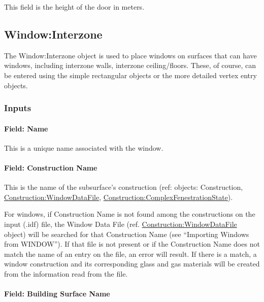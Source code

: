 This field is the height of the door in meters.

\subsection{Window:Interzone}\label{windowinterzone}

The Window:Interzone object is used to place windows on surfaces that can have windows, including interzone walls, interzone ceiling/floors. These, of course, can be entered using the simple rectangular objects or the more detailed vertex entry objects.

\subsubsection{Inputs}\label{inputs-17-010}

\paragraph{Field: Name}\label{field-name-13-011}

This is a unique name associated with the window.

\paragraph{Field: Construction Name}\label{field-construction-name-13}

This is the name of the subsurface's construction (ref: objects: Construction, \hyperref[constructionwindowdatafile]{Construction:WindowDataFile}, \hyperref[constructioncomplexfenestrationstate]{Construction:ComplexFenestrationState}).

For windows, if Construction Name is not found among the constructions on the input (.idf) file, the Window Data File (ref. \hyperref[constructionwindowdatafile]{Construction:WindowDataFile} object) will be searched for that Construction Name (see ``Importing Windows from WINDOW''). If that file is not present or if the Construction Name does not match the name of an entry on the file, an error will result. If there is a match, a window construction and its corresponding glass and gas materials will be created from the information read from the file.

\paragraph{Field: Building Surface Name}\label{field-building-surface-name-3}

